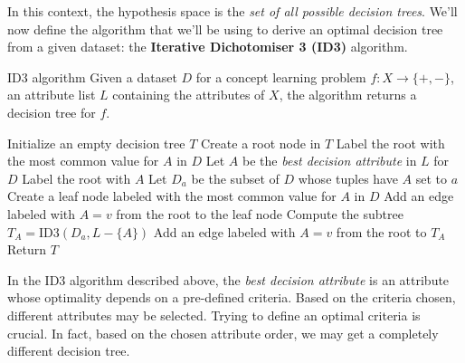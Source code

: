 \documentclass[a4paper, 12pt]{report}
\begin{document}
    In this context, the hypothesis space is the \textit{set of all possible decision trees}. We'll now define the algorithm that we'll be using to derive an optimal decision tree from a given dataset: the \textbf{Iterative Dichotomiser 3 (ID3)} algorithm.

    \begin{framedalgo}[label={id3}]{ID3 algorithm}
        Given a dataset $D$ for a concept learning problem $f : X \to \{+,-\}$, an attribute list $L$ containing the attributes of $X$, the algorithm returns a decision tree for $f$.
        \begin{algorithmic}
                \State Initialize an empty decision tree $T$
                \State Create a root node in $T$
                    \State Label the root with the most common value for $A$ in $D$
                \Else
                    \State Let $A$ be the \textit{best decision attribute} in $L$ for $D$
                    \State Label the root with $A$
                        \State Let $D_a$ be the subset of $D$ whose tuples have $A$ set to $a$
                            \State Create a leaf node labeled with the most common value for $A$ in $D$
                            \State Add an edge labeled with $A = v$ from the root to the leaf node
                        \Else
                            \State Compute the subtree $T_A = \mathrm{ID3}(D_a, L-\{A\})$
                            \State Add an edge labeled with $A = v$ from the root to $T_A$
                        \EndIf
                    \EndFor
                    \EndIf
                \State Return $T$
            \EndFunction
        \end{algorithmic}
    \end{framedalgo}

    In the ID3 algorithm described above, the \textit{best decision attribute} is an attribute whose optimality depends on a pre-defined criteria. Based on the criteria chosen, different attributes may be selected. Trying to define an optimal criteria is crucial. In fact, based on the chosen attribute order, we may get a completely different decision tree.
    
\end{document}
